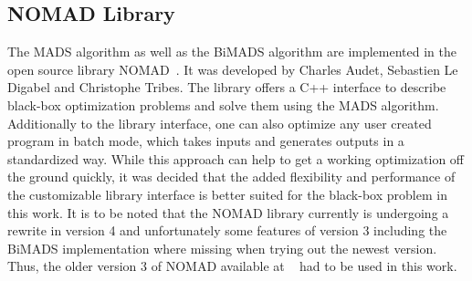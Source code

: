 \documentclass[a4paper,10pt]{article}
\begin{document}
    \subsection{NOMAD Library}

    The MADS algorithm as well as the BiMADS algorithm are implemented in the
    open source library NOMAD~\cite{nomad3}.
    It was developed by Charles Audet, Sebastien Le Digabel
    and Christophe Tribes.
    The library offers a C++ interface to describe black-box optimization
    problems and solve them using the MADS algorithm.
    Additionally to the library interface, one can also optimize
    any user created program in batch mode, which takes inputs and generates
    outputs in a standardized way.
    While this approach can help to get a working optimization
    off the ground quickly, it was decided that the added
    flexibility and performance of the customizable library interface
    is better suited for the black-box problem in this work.
    It is to be noted that the NOMAD library currently is undergoing
    a rewrite in version 4 and unfortunately some features of version 3
    including the BiMADS implementation where missing when trying out
    the newest version.
    Thus, the older version 3 of NOMAD available at 
    ~\cite{nomad_website} had to be used in this work.
\end{document}
